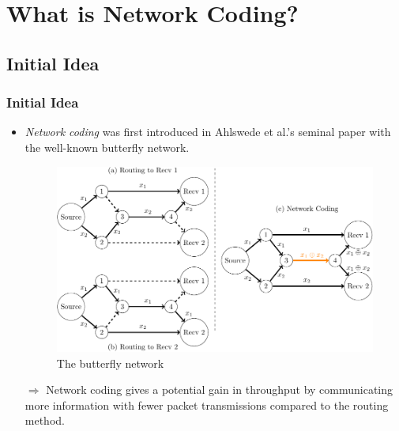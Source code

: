 \documentclass[c]{beamer}
\begin{document}

	




\section{What is Network Coding?}
\subsection{Initial Idea}
\begin{frame}[c]
\frametitle{Initial Idea}

	\begin{itemize}
		\item \textit{Network coding} was first introduced in Ahlswede et al.'s seminal paper \cite{Ahlswede:2000} with the well-known butterfly network.
			\begin{figure}[H]
			\caption{The butterfly network \label{fig:The-butterfly-network}}
			
			\centering{}\includegraphics[width=0.5\paperwidth]{../figures/ahlswede_butterfly_network}
			\end{figure}
		\item[$\Longrightarrow$] Network coding gives a potential gain in throughput by communicating more information with fewer packet transmissions compared to the routing method.
	\end{itemize}

\end{frame}
\end{document}
